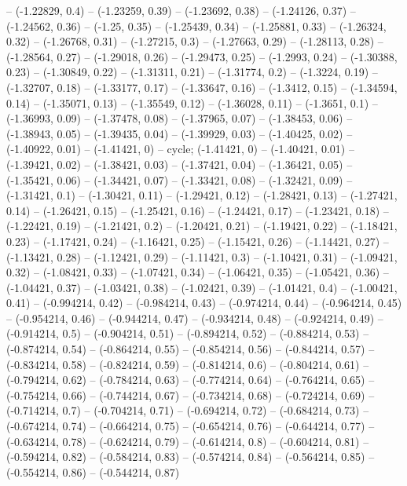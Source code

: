 -- (-1.22829, 0.4)
-- (-1.23259, 0.39)
-- (-1.23692, 0.38)
-- (-1.24126, 0.37)
-- (-1.24562, 0.36)
-- (-1.25, 0.35)
-- (-1.25439, 0.34)
-- (-1.25881, 0.33)
-- (-1.26324, 0.32)
-- (-1.26768, 0.31)
-- (-1.27215, 0.3)
-- (-1.27663, 0.29)
-- (-1.28113, 0.28)
-- (-1.28564, 0.27)
-- (-1.29018, 0.26)
-- (-1.29473, 0.25)
-- (-1.2993, 0.24)
-- (-1.30388, 0.23)
-- (-1.30849, 0.22)
-- (-1.31311, 0.21)
-- (-1.31774, 0.2)
-- (-1.3224, 0.19)
-- (-1.32707, 0.18)
-- (-1.33177, 0.17)
-- (-1.33647, 0.16)
-- (-1.3412, 0.15)
-- (-1.34594, 0.14)
-- (-1.35071, 0.13)
-- (-1.35549, 0.12)
-- (-1.36028, 0.11)
-- (-1.3651, 0.1)
-- (-1.36993, 0.09)
-- (-1.37478, 0.08)
-- (-1.37965, 0.07)
-- (-1.38453, 0.06)
-- (-1.38943, 0.05)
-- (-1.39435, 0.04)
-- (-1.39929, 0.03)
-- (-1.40425, 0.02)
-- (-1.40922, 0.01)
-- (-1.41421, 0)
-- cycle;
\drawBand (-1.41421, 0)
-- (-1.40421, 0.01)
-- (-1.39421, 0.02)
-- (-1.38421, 0.03)
-- (-1.37421, 0.04)
-- (-1.36421, 0.05)
-- (-1.35421, 0.06)
-- (-1.34421, 0.07)
-- (-1.33421, 0.08)
-- (-1.32421, 0.09)
-- (-1.31421, 0.1)
-- (-1.30421, 0.11)
-- (-1.29421, 0.12)
-- (-1.28421, 0.13)
-- (-1.27421, 0.14)
-- (-1.26421, 0.15)
-- (-1.25421, 0.16)
-- (-1.24421, 0.17)
-- (-1.23421, 0.18)
-- (-1.22421, 0.19)
-- (-1.21421, 0.2)
-- (-1.20421, 0.21)
-- (-1.19421, 0.22)
-- (-1.18421, 0.23)
-- (-1.17421, 0.24)
-- (-1.16421, 0.25)
-- (-1.15421, 0.26)
-- (-1.14421, 0.27)
-- (-1.13421, 0.28)
-- (-1.12421, 0.29)
-- (-1.11421, 0.3)
-- (-1.10421, 0.31)
-- (-1.09421, 0.32)
-- (-1.08421, 0.33)
-- (-1.07421, 0.34)
-- (-1.06421, 0.35)
-- (-1.05421, 0.36)
-- (-1.04421, 0.37)
-- (-1.03421, 0.38)
-- (-1.02421, 0.39)
-- (-1.01421, 0.4)
-- (-1.00421, 0.41)
-- (-0.994214, 0.42)
-- (-0.984214, 0.43)
-- (-0.974214, 0.44)
-- (-0.964214, 0.45)
-- (-0.954214, 0.46)
-- (-0.944214, 0.47)
-- (-0.934214, 0.48)
-- (-0.924214, 0.49)
-- (-0.914214, 0.5)
-- (-0.904214, 0.51)
-- (-0.894214, 0.52)
-- (-0.884214, 0.53)
-- (-0.874214, 0.54)
-- (-0.864214, 0.55)
-- (-0.854214, 0.56)
-- (-0.844214, 0.57)
-- (-0.834214, 0.58)
-- (-0.824214, 0.59)
-- (-0.814214, 0.6)
-- (-0.804214, 0.61)
-- (-0.794214, 0.62)
-- (-0.784214, 0.63)
-- (-0.774214, 0.64)
-- (-0.764214, 0.65)
-- (-0.754214, 0.66)
-- (-0.744214, 0.67)
-- (-0.734214, 0.68)
-- (-0.724214, 0.69)
-- (-0.714214, 0.7)
-- (-0.704214, 0.71)
-- (-0.694214, 0.72)
-- (-0.684214, 0.73)
-- (-0.674214, 0.74)
-- (-0.664214, 0.75)
-- (-0.654214, 0.76)
-- (-0.644214, 0.77)
-- (-0.634214, 0.78)
-- (-0.624214, 0.79)
-- (-0.614214, 0.8)
-- (-0.604214, 0.81)
-- (-0.594214, 0.82)
-- (-0.584214, 0.83)
-- (-0.574214, 0.84)
-- (-0.564214, 0.85)
-- (-0.554214, 0.86)
-- (-0.544214, 0.87)
